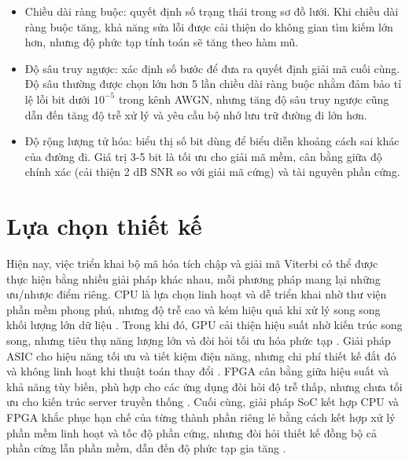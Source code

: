 \documentclass[../DoAn.tex]{subfiles}
\begin{document}
\begin{itemize} 
\item Chiều dài ràng buộc: quyết định số trạng thái trong sơ đồ lưới. Khi chiều dài ràng buộc tăng, khả năng sửa lỗi được cải thiện do không gian tìm kiếm lớn hơn, nhưng độ phức tạp tính toán sẽ tăng theo hàm mũ.
\item Độ sâu truy ngược: xác định số bước để đưa ra quyết định giải mã cuối cùng. Độ sâu thường được chọn lớn hơn 5 lần chiều dài ràng buộc nhằm đảm bảo tỉ lệ lỗi bit dưới $10^{-5}$ trong kênh AWGN, nhưng tăng độ sâu truy ngược cũng dẫn đến tăng độ trễ xử lý và yêu cầu bộ nhớ lưu trữ đường đi lớn hơn.
\item Độ rộng lượng tử hóa: biểu thị số bit dùng để biểu diễn khoảng cách sai khác của đường đi. Giá trị 3-5 bit là tối ưu cho giải mã mềm, cân bằng giữa độ chính xác (cải thiện 2 dB SNR so với giải mã cứng) và tài nguyên phần cứng.
\end{itemize}

\section{Lựa chọn thiết kế}

Hiện nay, việc triển khai bộ mã hóa tích chập và giải mã Viterbi có thể được thực hiện bằng nhiều giải pháp khác nhau, mỗi phương pháp mang lại những ưu/nhược điểm riêng. CPU là lựa chọn linh hoạt và dễ triển khai nhờ thư viện phần mềm phong phú, nhưng độ trễ cao và kém hiệu quả khi xử lý song song khối lượng lớn dữ liệu \cite{noauthor_viterbi_nodate}. Trong khi đó, GPU cải thiện hiệu suất nhờ kiến trúc song song, nhưng tiêu thụ năng lượng lớn và đòi hỏi tối ưu hóa phức tạp \cite{liu_765-gbs_2025}. Giải pháp ASIC cho hiệu năng tối ưu và tiết kiệm điện năng, nhưng chi phí thiết kế đắt đỏ và không linh hoạt khi thuật toán thay đổi \cite{noauthor_tms320c6416_nodate}. FPGA cân bằng giữa hiệu suất và khả năng tùy biến, phù hợp cho các ứng dụng đòi hỏi độ trễ thấp, nhưng chưa tối ưu cho kiến trúc server truyền thống \cite{li_design_2012}. Cuối cùng, giải pháp SoC kết hợp CPU và FPGA khắc phục hạn chế của từng thành phần riêng lẻ bằng cách kết hợp xử lý phần mềm linh hoạt và tốc độ phần cứng, nhưng đòi hỏi thiết kế đồng bộ cả phần cứng lẫn phần mềm, dẫn đến độ phức tạp gia tăng \cite{mamarde_viterbi_2018}.
\end{document}

